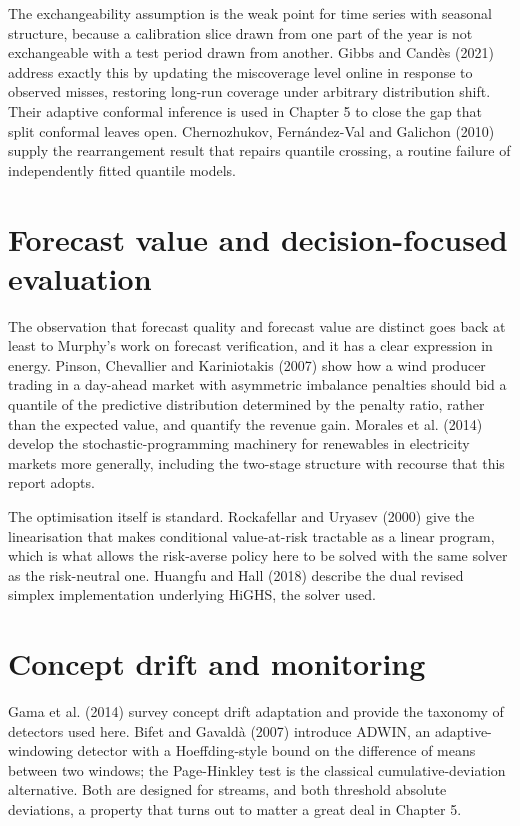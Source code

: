 \documentclass[11pt,a4paper,oneside]{report}
\begin{document}
The exchangeability assumption is the weak point for time series with seasonal structure, because a calibration slice drawn from one part of the year is not exchangeable with a test period drawn from another. Gibbs and Candès (2021) address exactly this by updating the miscoverage level online in response to observed misses, restoring long-run coverage under arbitrary distribution shift. Their adaptive conformal inference is used in Chapter 5 to close the gap that split conformal leaves open. Chernozhukov, Fernández-Val and Galichon (2010) supply the rearrangement result that repairs quantile crossing, a routine failure of independently fitted quantile models.

\section{Forecast value and decision-focused evaluation}

The observation that forecast quality and forecast value are distinct goes back at least to Murphy's work on forecast verification, and it has a clear expression in energy. Pinson, Chevallier and Kariniotakis (2007) show how a wind producer trading in a day-ahead market with asymmetric imbalance penalties should bid a quantile of the predictive distribution determined by the penalty ratio, rather than the expected value, and quantify the revenue gain. Morales et al. (2014) develop the stochastic-programming machinery for renewables in electricity markets more generally, including the two-stage structure with recourse that this report adopts.

The optimisation itself is standard. Rockafellar and Uryasev (2000) give the linearisation that makes conditional value-at-risk tractable as a linear program, which is what allows the risk-averse policy here to be solved with the same solver as the risk-neutral one. Huangfu and Hall (2018) describe the dual revised simplex implementation underlying HiGHS, the solver used.

\section{Concept drift and monitoring}

Gama et al. (2014) survey concept drift adaptation and provide the taxonomy of detectors used here. Bifet and Gavaldà (2007) introduce ADWIN, an adaptive-windowing detector with a Hoeffding-style bound on the difference of means between two windows; the Page-Hinkley test is the classical cumulative-deviation alternative. Both are designed for streams, and both threshold absolute deviations, a property that turns out to matter a great deal in Chapter 5.
\end{document}

